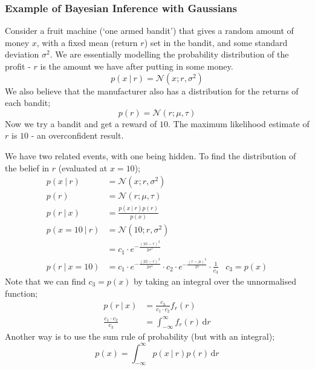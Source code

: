 \documentclass[a4paper, 12pt]{article}
\newcommand{\defint}[4]{\int_{#1}^{#2} #3 \, \mathrm{d}#4}
\begin{document}
            \subsubsection*{Example of Bayesian Inference with Gaussians}
                Consider a fruit machine (`one armed bandit') that gives a random amount of money $x$, with a fixed mean (return $r$) set in the bandit, and some standard deviation $\sigma^2$.
                We are essentially modelling the probability distribution of the profit - $r$ is the amount we have after putting in some money.
                $$p(x\ |\ r) = \mathcal{N}(x; r, \sigma^2)$$
                We also believe that the manufacturer also has a distribution for the returns of each bandit;
                $$p(r) = \mathcal{N}(r; \mu, \tau)$$
                Now we try a bandit and get a reward of $10$.
                The maximum likelihood estimate of $r$ is $10$ - an overconfident result.
                \medskip

                We have two related events, with one being hidden.
                To find the distribution of the belief in $r$ (evaluated at $x = 10$);
                \begin{align*}
                    p(x\ |\ r) & = \mathcal{N}(x; r, \sigma^2) \\
                    p(r) & = \mathcal{N}(r; \mu, \tau) \\
                    p(r\ |\ x) & = \frac{p(x\ |\ r)p(r)}{p(x)} \\
                    p(x = 10\ |\ r) & = \mathcal{N}(10; r, \sigma^2) \\
                    & = c_1 \cdot e^{-\frac{(10 - r)^2}{2 \sigma^2}} \\
                    p(r\ |\ x = 10) & = c_1 \cdot e^{-\frac{(10 - r)^2}{2 \sigma^2}} \cdot c_2 \cdot e^{-\frac{(r - \mu)^2}{2\tau}} \cdot \frac{1}{c_3} & c_3 = p(x)
                \end{align*}
                Note that we can find $c_3 = p(x)$ by taking an integral over the unnormalised function;
                \begin{align*}
                    p(r\ |\ x) & = \frac{c_3}{c_1 \cdot c_2} f_r(r) \\
                    \frac{c_1 \cdot c_2}{c_3} & = \defint{-\infty}{\infty}{f_r(r)}{r}
                \end{align*}
                Another way is to use the sum rule of probability (but with an integral);
                $$p(x) = \defint{-\infty}{\infty}{p(x\ |\ r)p(r)}{r}$$
\end{document}

